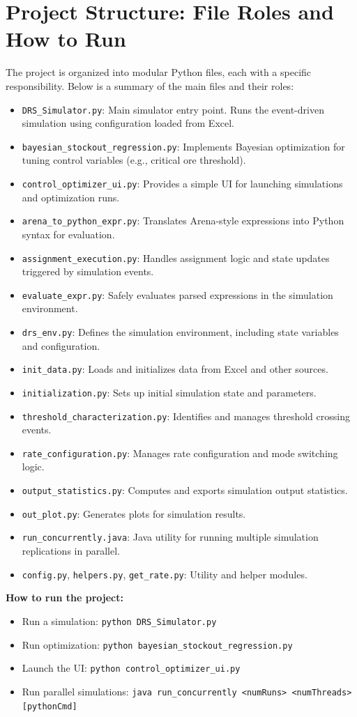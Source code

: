 \documentclass[11pt]{article}
\begin{document}
\section{Project Structure: File Roles and How to Run}
The project is organized into modular Python files, each with a specific responsibility. Below is a summary of the main files and their roles:
\begin{itemize}
	\item \texttt{DRS\_Simulator.py}: Main simulator entry point. Runs the event-driven simulation using configuration loaded from Excel.
	\item \texttt{bayesian\_stockout\_regression.py}: Implements Bayesian optimization for tuning control variables (e.g., critical ore threshold).
	\item \texttt{control\_optimizer\_ui.py}: Provides a simple UI for launching simulations and optimization runs.
	\item \texttt{arena\_to\_python\_expr.py}: Translates Arena-style expressions into Python syntax for evaluation.
	\item \texttt{assignment\_execution.py}: Handles assignment logic and state updates triggered by simulation events.
	\item \texttt{evaluate\_expr.py}: Safely evaluates parsed expressions in the simulation environment.
	\item \texttt{drs\_env.py}: Defines the simulation environment, including state variables and configuration.
	\item \texttt{init\_data.py}: Loads and initializes data from Excel and other sources.
	\item \texttt{initialization.py}: Sets up initial simulation state and parameters.
	\item \texttt{threshold\_characterization.py}: Identifies and manages threshold crossing events.
	\item \texttt{rate\_configuration.py}: Manages rate configuration and mode switching logic.
	\item \texttt{output\_statistics.py}: Computes and exports simulation output statistics.
	\item \texttt{out\_plot.py}: Generates plots for simulation results.
	\item \texttt{run\_concurrently.java}: Java utility for running multiple simulation replications in parallel.
	\item \texttt{config.py}, \texttt{helpers.py}, \texttt{get\_rate.py}: Utility and helper modules.
\end{itemize}
\textbf{How to run the project:}
\begin{itemize}
	\item Run a simulation: \texttt{python DRS\_Simulator.py}
	\item Run optimization: \texttt{python bayesian\_stockout\_regression.py}
	\item Launch the UI: \texttt{python control\_optimizer\_ui.py}
	\item Run parallel simulations: \texttt{java run\_concurrently <numRuns> <numThreads> [pythonCmd]}
\end{itemize}
\end{document}
